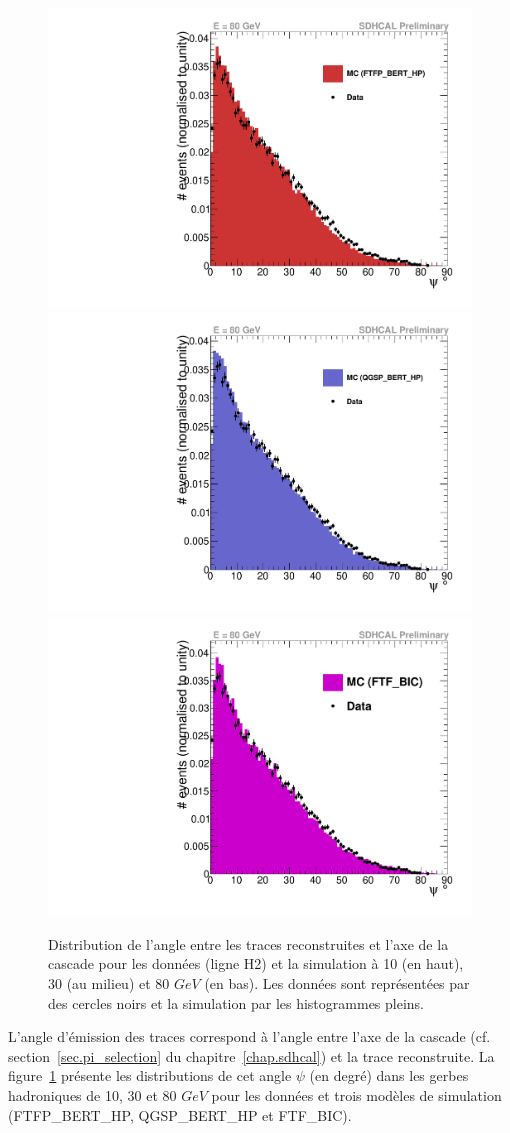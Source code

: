 \begin{figure}[!ht]
  \includegraphics[width=.32\textwidth]{Shower/figs/trackangle_pi-_80GeV_ftfp_bert_hp.pdf}
  \includegraphics[width=.32\textwidth]{Shower/figs/trackangle_pi-_80GeV_qgsp_bert_hp.pdf}
  \includegraphics[width=.32\textwidth]{Shower/figs/trackangle_pi-_80GeV_ftf_bic.pdf}
  \caption{Distribution de l'angle entre les traces reconstruites et l'axe de la cascade pour les données (ligne H2) et la simulation à 10 (en haut), 30 (au milieu) et 80 $GeV$ (en bas). Les données sont représentées par des cercles noirs et la simulation par les histogrammes pleins. \label{fig.pi-_trackangle}}
\end{figure}
L'angle d'émission des traces correspond à l'angle entre l'axe de la cascade (cf. section~\ref{sec.pi_selection} du chapitre~\ref{chap.sdhcal}) et la trace reconstruite. La figure~\ref{fig.pi-_trackangle} présente les distributions de cet angle $\psi$ (en degré) dans les gerbes hadroniques de 10, 30 et 80 $GeV$ pour les données et trois modèles de simulation (FTFP\_BERT\_HP, QGSP\_BERT\_HP et FTF\_BIC). 
